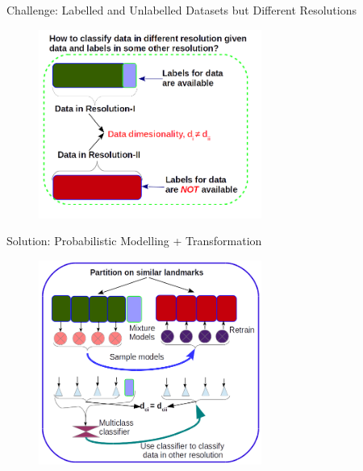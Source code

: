 \documentclass[utf8, a4paper]{beamer}
\begin{document}

\begin{frame}
  {Challenge: Labelled and Unlabelled Datasets but Different Resolutions }
  \begin{figure}
\centering
  \includegraphics[trim={0cm 0cm 0cm 0cm},clip, width=0.65\textwidth]{images/multires_challenge}
\end{figure}
  
\end{frame}


\begin{frame}
  {Solution: Probabilistic Modelling + Transformation}
  
  \vspace{-1cm}
  \begin{figure}
\centering
  \includegraphics[trim={0cm 0cm 0cm 0cm},clip, width=0.65\textwidth]{images/multires_solution}
\end{figure}
  
\end{frame}
\end{document}
